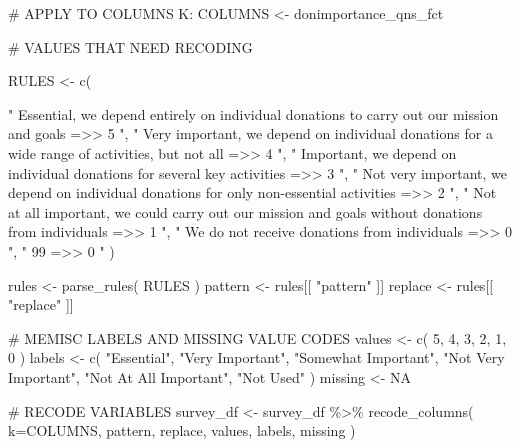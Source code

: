 \documentclass[
  letterpaper,
]{scrbook}
\newenvironment{Shaded}{\begin{snugshade}}{\end{snugshade}}
\newcommand{\AttributeTok}[1]{\textcolor[rgb]{0.40,0.45,0.13}{#1}}
\newcommand{\CommentTok}[1]{\textcolor[rgb]{0.37,0.37,0.37}{#1}}
\newcommand{\ConstantTok}[1]{\textcolor[rgb]{0.56,0.35,0.01}{#1}}
\newcommand{\DecValTok}[1]{\textcolor[rgb]{0.68,0.00,0.00}{#1}}
\newcommand{\FunctionTok}[1]{\textcolor[rgb]{0.28,0.35,0.67}{#1}}
\newcommand{\NormalTok}[1]{\textcolor[rgb]{0.00,0.23,0.31}{#1}}
\newcommand{\OtherTok}[1]{\textcolor[rgb]{0.00,0.23,0.31}{#1}}
\newcommand{\SpecialCharTok}[1]{\textcolor[rgb]{0.37,0.37,0.37}{#1}}
\newcommand{\StringTok}[1]{\textcolor[rgb]{0.13,0.47,0.30}{#1}}
\begin{document}
\begin{Shaded}
\begin{Highlighting}[]
\CommentTok{\# APPLY TO COLUMNS K:}
\NormalTok{COLUMNS }\OtherTok{\textless{}{-}}\NormalTok{  donimportance\_qns\_fct}

\CommentTok{\# VALUES THAT NEED RECODING}

\NormalTok{RULES }\OtherTok{\textless{}{-}} \FunctionTok{c}\NormalTok{(    }

  \StringTok{"          Essential, we depend entirely on individual donations to carry out our mission and goals  =\textgreater{}\textgreater{}  5  "}\NormalTok{,}
  \StringTok{"     Very important, we depend on individual donations for a wide range of activities, but not all  =\textgreater{}\textgreater{}  4  "}\NormalTok{,}
  \StringTok{"                           Important, we depend on individual donations for several key activities  =\textgreater{}\textgreater{}  3  "}\NormalTok{,}
  \StringTok{"           Not very important, we depend on individual donations for only non{-}essential activities  =\textgreater{}\textgreater{}  2  "}\NormalTok{,}
  \StringTok{" Not at all important, we could carry out our mission and goals without donations from individuals  =\textgreater{}\textgreater{}  1  "}\NormalTok{,}
  \StringTok{"                                                      We do not receive donations from individuals  =\textgreater{}\textgreater{}  0  "}\NormalTok{,}
  \StringTok{"                                                                                                99  =\textgreater{}\textgreater{}  0  "}\NormalTok{  )}


\NormalTok{rules }\OtherTok{\textless{}{-}} \FunctionTok{parse\_rules}\NormalTok{( RULES )          }
\NormalTok{pattern }\OtherTok{\textless{}{-}}\NormalTok{ rules[[ }\StringTok{"pattern"}\NormalTok{ ]]}
\NormalTok{replace }\OtherTok{\textless{}{-}}\NormalTok{ rules[[ }\StringTok{"replace"}\NormalTok{ ]]}

\CommentTok{\# MEMISC LABELS AND MISSING VALUE CODES }
\NormalTok{values  }\OtherTok{\textless{}{-}} \FunctionTok{c}\NormalTok{( }\DecValTok{5}\NormalTok{, }\DecValTok{4}\NormalTok{, }\DecValTok{3}\NormalTok{, }\DecValTok{2}\NormalTok{, }\DecValTok{1}\NormalTok{, }\DecValTok{0}\NormalTok{  )}
\NormalTok{labels  }\OtherTok{\textless{}{-}} \FunctionTok{c}\NormalTok{( }\StringTok{"Essential"}\NormalTok{, }\StringTok{"Very Important"}\NormalTok{, }
              \StringTok{"Somewhat Important"}\NormalTok{, }\StringTok{"Not Very Important"}\NormalTok{, }
              \StringTok{"Not At All Important"}\NormalTok{, }\StringTok{"Not Used"}\NormalTok{ )}
\NormalTok{missing }\OtherTok{\textless{}{-}} \ConstantTok{NA}

\CommentTok{\# RECODE VARIABLES }
\NormalTok{survey\_df }\OtherTok{\textless{}{-}} 
\NormalTok{  survey\_df }\SpecialCharTok{\%\textgreater{}\%} 
  \FunctionTok{recode\_columns}\NormalTok{( }\AttributeTok{k=}\NormalTok{COLUMNS, pattern, replace, values, labels, missing )}
\end{Highlighting}
\end{Shaded}
\end{document}
